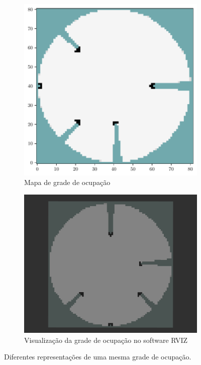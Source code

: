 \begin{figure}
  \centering
  \begin{subfigure}{0.45\textwidth}
    \includegraphics[width=\textwidth]{figs/grid_map_view_big.pdf} 
    \caption{Mapa de grade de ocupação}
    \label{fig:grid-map-big-rep}
  \end{subfigure}
  \hfill
  \begin{subfigure}{0.49\textwidth}
    \includegraphics[width=\textwidth]{figs/grid-map.png} 
    \caption{Visualização da grade de ocupação no software RVIZ}
    \label{fig:}
  \end{subfigure}
  \caption{Diferentes representações de uma mesma grade de ocupação.}
  \label{fig:occupancy-grid-visualization-comparsion}
\end{figure}

